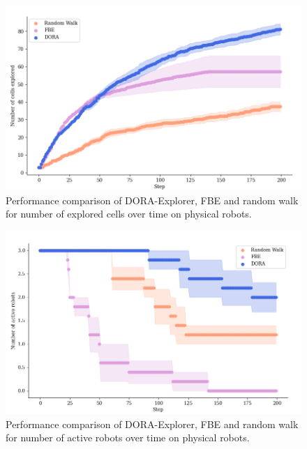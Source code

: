 \begin{figure}[H]
    \centering
    \captionsetup{belowskip=-5pt}
    \includegraphics[width=0.82\columnwidth]{images/explored.png}
    \caption{Performance comparison of DORA-Explorer, FBE and random walk for number of explored cells over time on physical robots.}
    \label{results:cells_explored_physical}
\end{figure}

\begin{figure}[H]
    \centering
    \captionsetup{belowskip=-5pt}
    \includegraphics[width=0.82\columnwidth]{images/activerobots.png}
    \caption{Performance comparison of DORA-Explorer, FBE and random walk for number of active robots over time on physical robots.}
    \label{results:active_robots_physical}
\end{figure}

